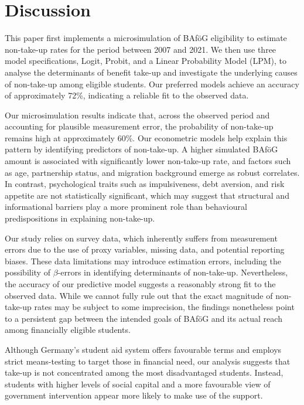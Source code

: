\section{Discussion}



This paper first implements a microsimulation of BAföG eligibility to estimate non-take-up rates for the period between 2007 and 2021. 
We then use three model specifications, Logit, Probit, and a Linear Probability Model (LPM), to analyse the determinants of benefit take-up and investigate the underlying causes of non-take-up among eligible students. 
Our preferred models achieve an accuracy of approximately 72\%, indicating a reliable fit to the observed data.

Our microsimulation results indicate that, across the observed period and accounting for plausible measurement error, the probability of non-take-up remains high at approximately 60\%.
Our econometric models help explain this pattern by identifying predictors of non-take-up. A higher simulated BAföG amount is associated with significantly lower non-take-up rate, and factors such as age, partnership status, and migration background emerge as robust correlates. 
In contrast, psychological traits such as impulsiveness, debt aversion, and risk appetite are not statistically significant, which may suggest that structural and informational barriers play a more prominent role than behavioural predispositions in explaining non-take-up.

Our study relies on survey data, which inherently suffers from measurement errors due to the use of proxy variables, missing data, and potential reporting biases. 
These data limitations may introduce estimation errors, including the possibility of \( \beta \)-errors in identifying determinants of non-take-up. 
Nevertheless, the accuracy of our predictive model suggests a reasonably strong fit to the observed data. 
While we cannot fully rule out that the exact magnitude of non-take-up rates may be subject to some imprecision, the findings nonetheless point to a persistent gap between the intended goals of BAföG and its actual reach among financially eligible students.


Although Germany’s student aid system offers favourable terms and employs strict means-testing to target those in financial need, our analysis suggests that take-up is not concentrated among the most disadvantaged students. 
Instead, students with higher levels of social capital and a more favourable view of government intervention appear more likely to make use of the support.

